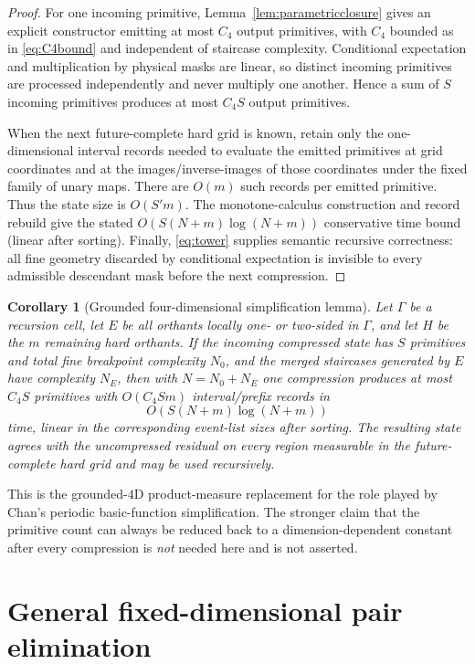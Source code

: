 \documentclass[12pt,a4paper]{article}
\newtheorem{corollary}[theorem]{Corollary}
\theoremstyle{definition}
\newcommand{\1}{\mathbf 1}
\begin{document}
\begin{proof}
For one incoming primitive, Lemma~\ref{lem:parametricclosure} gives an explicit constructor emitting at most $C_4$ output primitives, with $C_4$ bounded as in \eqref{eq:C4bound} and independent of staircase complexity. Conditional expectation and multiplication by physical masks are linear, so distinct incoming primitives are processed independently and never multiply one another. Hence a sum of $S$ incoming primitives produces at most $C_4S$ output primitives.

When the next future-complete hard grid is known, retain only the one-dimensional interval records needed to evaluate the emitted primitives at grid coordinates and at the images/inverse-images of those coordinates under the fixed family of unary maps. There are $O(m)$ such records per emitted primitive. Thus the state size is $O(S'm)$. The monotone-calculus construction and record rebuild give the stated $O(S(N+m)\log(N+m))$ conservative time bound (linear after sorting). Finally, \eqref{eq:tower} supplies semantic recursive correctness: all fine geometry discarded by conditional expectation is invisible to every admissible descendant mask before the next compression.
\end{proof}

\begin{corollary}[Grounded four-dimensional simplification lemma] \label{cor:simplification}
Let $\Gamma$ be a recursion cell, let $E$ be all orthants locally one- or two-sided in $\Gamma$, and let $H$ be the $m$ remaining hard orthants.  If the incoming compressed state has $S$ primitives and total fine breakpoint complexity $N_0$, and the merged staircases generated by $E$ have complexity $N_E$, then with $N=N_0+N_E$ one compression produces at most $C_4S$ primitives with $O(C_4Sm)$ interval/prefix records in
\[
O(S(N+m)\log(N+m))
\]
time, linear in the corresponding event-list sizes after sorting.  The resulting state agrees with the uncompressed residual on every region measurable in the future-complete hard grid and may be used recursively.
\end{corollary}

This is the grounded-$4$D product-measure replacement for the role played by Chan's periodic basic-function simplification.  The stronger claim that the primitive count can always be reduced back to a dimension-dependent constant after every compression is \emph{not} needed here and is not asserted.


\section{General fixed-dimensional pair elimination}             \label{sec:generalpair}
\end{document}
